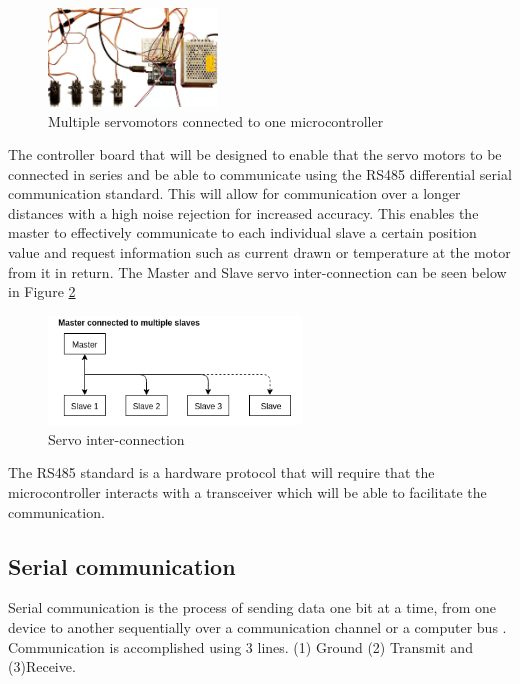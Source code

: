 \begin{figure}[H]
\centering
\includegraphics[width=0.4\textwidth]{toomanywires.jpg}
\caption{Multiple servomotors connected to one microcontroller\cite{toomanywires}}
\label{fig:typset}
\end{figure}

The controller board that will be designed to enable that the servo motors to be connected in series and be able to communicate using the RS485 differential serial communication standard. This will allow for communication over a longer distances with a high noise rejection for increased accuracy. This enables the master to effectively communicate to each individual slave a certain position value and request information such as current drawn or temperature at the motor from it in return. The Master and Slave servo inter-connection can be seen below in Figure \ref{fig:servoconnection} \newline

\begin{figure}[H]
\centering
\includegraphics[width=0.6\textwidth]{master_slave.png}
\caption{Servo inter-connection}
\label{fig:servoconnection}
\end{figure}

The RS485 standard is a hardware protocol that will require that the microcontroller interacts with a transceiver which will be able to facilitate the communication. 


\newpage
\subsection{Serial communication}
Serial communication is the process of sending data one bit at a time, from one device to another sequentially over a communication channel or a computer bus \cite{serial_comms}. Communication is accomplished using 3 lines. (1) Ground (2) Transmit and (3)Receive. 


